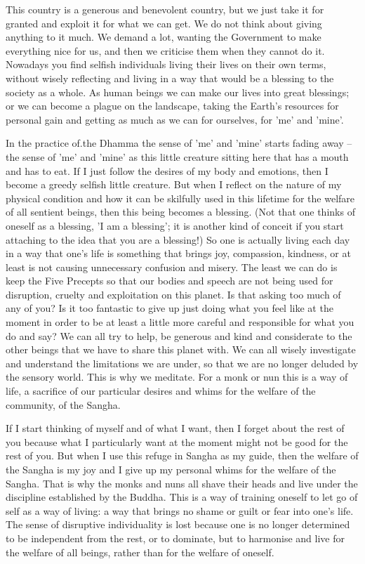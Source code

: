 This country is a generous and benevolent country, but we just take it for granted and exploit it for what we can get. We do not think about giving anything to it much. We demand a lot, wanting the Government to make everything nice for us, and then we criticise them when they cannot do it. Nowadays you find selfish individuals living their lives on their own terms, without wisely reflecting and living in a way that would be a blessing to the society as a whole. As human beings we can make our lives into great blessings; or we can become a plague on the landscape, taking the Earth's resources for personal gain and getting as much as we can for ourselves, for 'me' and 'mine'.

In the practice of.the Dhamma the sense of 'me' and 'mine' starts fading away -- the sense of 'me' and 'mine' as this little creature sitting here that has a mouth and has to eat. If I just follow the desires of my body and emotions, then I become a greedy selfish little creature. But when I reflect on the nature of my physical condition and how it can be skilfully used in this lifetime for the welfare of all sentient beings, then this being becomes a blessing. (Not that one thinks of oneself as a blessing, 'I am a blessing'; it is another kind of conceit if you start attaching to the idea that you are a blessing!) So one is actually living each day in a way that one's life is something that brings joy, compassion, kindness, or at least is not causing unnecessary confusion and misery. The least we can do is keep the Five Precepts so that our bodies and speech are not being used for disruption, cruelty and exploitation on this planet. Is that asking too much of any of you? Is it too fantastic to give up just doing what you feel like at the moment in order to be at least a little more careful and responsible for what you do and say? We can all try to help, be generous and kind and considerate to the other beings that we have to share this planet with. We can all wisely investigate and understand the limitations we are under, so that we are no longer deluded by the sensory world. This is why we meditate. For a monk or nun this is a way of life, a sacrifice of our particular desires and whims for the welfare of the community, of the Sangha.

If I start thinking of myself and of what I want, then I forget about the rest of you because what I particularly want at the moment might not be good for the rest of you. But when I use this refuge in Sangha as my guide, then the welfare of the Sangha is my joy and I give up my personal whims for the welfare of the Sangha. That is why the monks and nuns all shave their heads and live under the discipline established by the Buddha. This is a way of training oneself to let go of self as a way of living: a way that brings no shame or guilt or fear into one's life. The sense of disruptive individuality is lost because one is no longer determined to be independent from the rest, or to dominate, but to harmonise and live for the welfare of all beings, rather than for the welfare of oneself.

